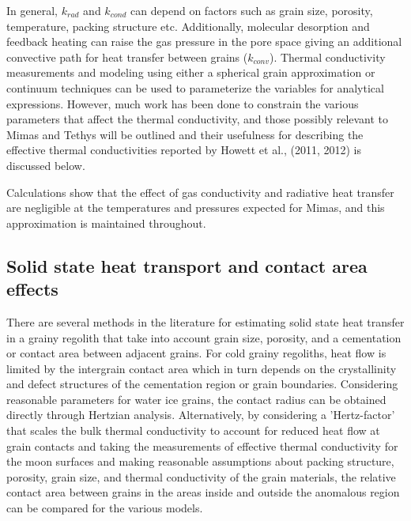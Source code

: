 \documentclass[11pt]{article} %
\begin{document}
	In general, $k_{rad}$ and $k_{cond}$ can depend on factors such as grain size, porosity, temperature, packing structure etc. Additionally, molecular desorption and feedback heating can raise the gas pressure in the pore space giving an additional convective path for heat transfer between grains ($k_{conv}$). Thermal conductivity measurements and modeling using either a spherical grain approximation or continuum techniques can be used to parameterize the variables for analytical expressions. However, much work has been done to constrain the various parameters that affect the thermal conductivity, and those possibly relevant to Mimas and Tethys will be outlined and their usefulness for describing the effective thermal conductivities reported by Howett et al., (2011, 2012) is discussed below.
	
	Calculations show that the effect of gas conductivity and radiative heat transfer are negligible at the temperatures and pressures expected for Mimas, and this approximation is maintained throughout. 
	

\subsection{Solid state heat transport and contact area effects}
	There are several methods in the literature for estimating solid state heat transfer in a grainy regolith that take into account grain size, porosity, and a cementation or contact area between adjacent grains. For cold grainy regoliths, heat flow is limited by the intergrain contact area which in turn depends on the crystallinity and defect structures of the cementation region or grain boundaries. Considering reasonable parameters for water ice grains, the contact radius can be obtained directly through Hertzian analysis. Alternatively, by considering a 'Hertz-factor' that scales the bulk thermal conductivity to account for reduced heat flow at grain contacts and taking the measurements of effective thermal conductivity for the moon surfaces and making reasonable assumptions about packing structure, porosity, grain size, and thermal conductivity of the grain materials, the relative contact area between grains in the areas inside and outside the anomalous region can be compared for the various models. 
	
\end{document}
